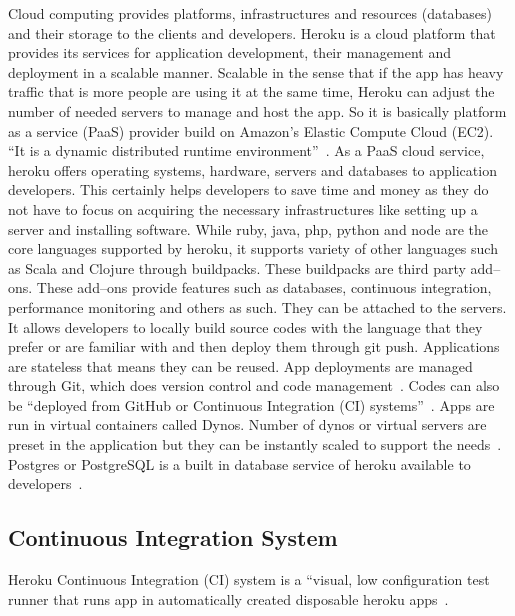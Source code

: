 Cloud computing provides platforms, infrastructures and resources (databases)
 and their storage to the clients and developers. Heroku is a cloud platform 
that provides its services for application development, their management and
 deployment in a scalable manner. Scalable in the sense that if the app has 
heavy traffic that is more people are using it at the same time, Heroku can 
adjust the number of needed servers to manage and host the app. So it is 
basically platform as a service (PaaS) provider build on Amazon's 
Elastic Compute Cloud (EC2). ``It is a dynamic distributed runtime 
environment''~\cite{www-devcenter-heroku}. As a PaaS cloud service, heroku
 offers operating systems, hardware, servers and databases to application 
developers. This certainly helps developers to save time and money as they do
 not have to focus on acquiring the necessary infrastructures like setting up 
a server and installing software. While ruby, java, php, python and node are 
the core languages supported by heroku, it supports variety 
 of other languages such as Scala and Clojure through buildpacks. These 
buildpacks are third party add--ons. These add--ons provide features such as
 databases, continuous integration, performance monitoring and others as such. 
They can be attached to the servers. It allows developers to locally build 
source codes with the language that they prefer or are familiar with and then
 deploy them through git push. Applications are stateless that means they can 
be reused. App deployments are managed through Git, which does version control
 and code management~\cite{www-how-heroku-works}. Codes can also be ``deployed 
from GitHub or Continuous Integration (CI) systems''~\cite{www-heroku-com}.   
Apps are run in virtual containers called Dynos. Number of dynos or virtual 
servers are preset in the application but they can be instantly scaled to 
support the needs~\cite{www-how-heroku-works}. Postgres or PostgreSQL is a 
built in database service of heroku available to developers~\cite{www-heroku-com}.

\subsection{Continuous Integration System}
Heroku Continuous Integration (CI) system is a ``visual, low configuration
 test runner that runs app in automatically created disposable 
heroku apps~\cite{www-heroku-ci}. 


